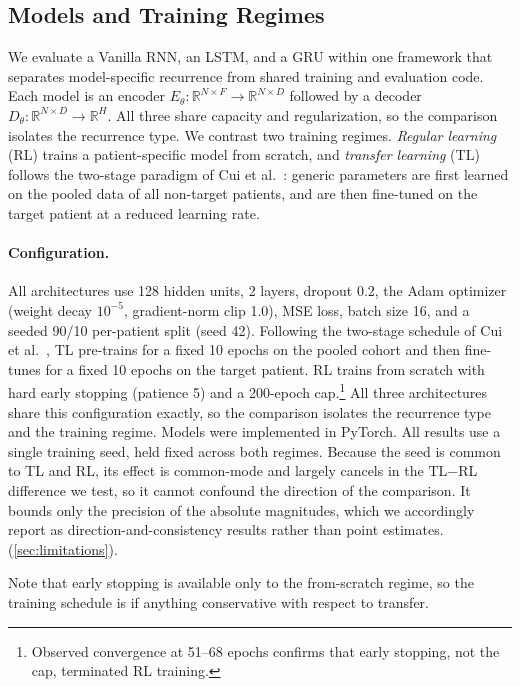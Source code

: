\documentclass[conference]{IEEEtran}
\begin{document}
\subsection{Models and Training Regimes}
\label{sec:models}
We evaluate a Vanilla RNN, an LSTM, and a GRU within one framework that separates
model-specific recurrence from shared training and evaluation code. Each model is
an encoder $E_\theta:\mathbb{R}^{N\times F}\!\to\mathbb{R}^{N\times D}$ followed by
a decoder $D_\theta:\mathbb{R}^{N\times D}\!\to\mathbb{R}^{H}$. All three share
capacity and regularization, so the comparison isolates the recurrence type. We
contrast two training regimes. \emph{Regular learning} (RL) trains a
patient-specific model from scratch, and \emph{transfer learning} (TL) follows the
two-stage paradigm of Cui et al.~\cite{CUI9474665}: generic parameters are first
learned on the pooled data of all non-target patients, and are then fine-tuned on
the target patient at a reduced learning rate.


\paragraph{Configuration.}
All architectures use 128 hidden units, 2 layers, dropout 0.2, the Adam optimizer
(weight decay $10^{-5}$, gradient-norm clip 1.0), MSE loss, batch size 16, and a
seeded 90/10 per-patient split (seed 42). Following the two-stage schedule of Cui
et al.~\cite{CUI9474665}, TL pre-trains for a fixed 10 epochs on the pooled cohort
and then fine-tunes for a fixed 10 epochs on the target patient. RL trains from
scratch with hard early stopping (patience 5) and a
200-epoch cap.\footnote{Observed convergence at 51--68 epochs confirms that early
stopping, not the cap, terminated RL training.} All three architectures share this
configuration exactly, so the comparison isolates the recurrence type and the
training regime. Models were implemented in PyTorch. All results use a single
training seed, held fixed across both regimes. Because the seed is common to TL and
RL, its effect is common-mode and largely cancels in the TL$-$RL difference we
test, so it cannot confound the direction of the comparison. It bounds only the
precision of the absolute magnitudes, which we accordingly report as
direction-and-consistency results rather than point estimates.
(\ref{sec:limitations}).

Note that early stopping is available only to the from-scratch regime, so the training schedule is if anything conservative with respect to transfer.
\end{document}
